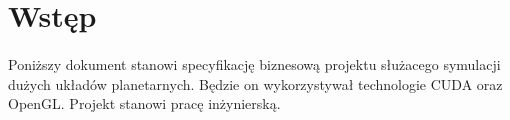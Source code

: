 \section{Wstęp}\label{sec:wstep}
	
\paragraph{}

Poniższy dokument stanowi specyfikację biznesową projektu służacego symulacji dużych układów planetarnych. Będzie on wykorzystywał technologie CUDA oraz OpenGL. Projekt stanowi pracę inżynierską.

